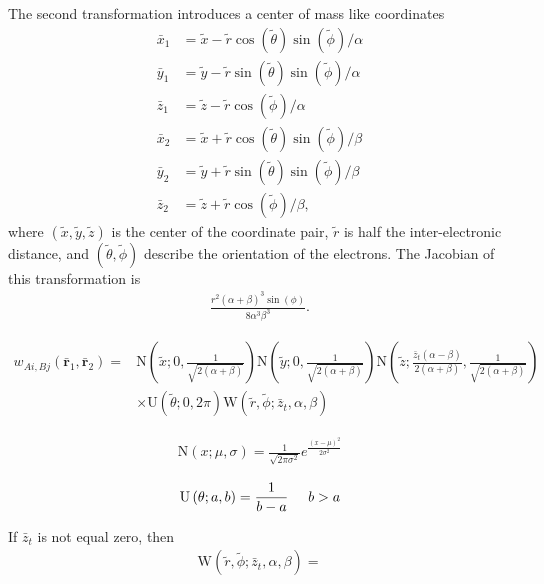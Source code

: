 \documentclass{revtex4}
\begin{document}
  The second transformation introduces a center of mass like coordinates 
  \begin{align}
    \bar{x}_1 &= \tilde{x} - \tilde{r} \cos(\tilde{\theta}) \sin(\tilde{\phi}) / \alpha \\
    \bar{y}_1 &= \tilde{y} - \tilde{r} \sin(\tilde{\theta}) \sin(\tilde{\phi}) / \alpha \\
    \bar{z}_1 &= \tilde{z} - \tilde{r} \cos(\tilde{\phi}) / \alpha \\
    \bar{x}_2 &= \tilde{x} + \tilde{r} \cos(\tilde{\theta}) \sin(\tilde{\phi}) / \beta \\
    \bar{y}_2 &= \tilde{y} + \tilde{r} \sin(\tilde{\theta}) \sin(\tilde{\phi}) / \beta \\
    \bar{z}_2 &= \tilde{z} + \tilde{r} \cos(\tilde{\phi}) / \beta,
  \end{align}
  where $(\tilde{x}, \tilde{y}, \tilde{z})$ is the center of the coordinate pair, $\tilde{r}$ is half the inter-electronic distance, and $(\tilde{\theta}, \tilde{\phi})$ describe the orientation of
  the electrons.
  The Jacobian of this transformation is
  \begin{align}
    \frac{r^2 (\alpha +\beta )^3 \sin (\phi )}{8 \alpha ^3 \beta ^3}.
  \end{align}

  \begin{align}
  w_{Ai,Bj}(\bar{\mathbf{r}}_1, \bar{\mathbf{r}}_2) =& 
  \mathrm{N}\left(\tilde{x}; 0, \frac{1}{\sqrt{2(\alpha + \beta)}}\right)
  \mathrm{N}\left(\tilde{y}; 0, \frac{1}{\sqrt{2(\alpha + \beta)}}\right)
  \mathrm{N}\left(\tilde{z}; \frac{\bar{z}_t (\alpha -\beta )}{2 (\alpha +\beta )}, \frac{1}{\sqrt{2(\alpha + \beta)}}\right) \nonumber \\
  & \times \mathrm{U}\left(\tilde{\theta}; 0, 2 \pi\right)
    \mathrm{W}\left(\tilde{r}, \tilde{\phi}; \bar{z}_t, \alpha, \beta\right)
  \end{align}

  \begin{align}
    \mathrm{N}\left(x; \mu, \sigma\right) = \frac{1}{\sqrt{2\pi \sigma^2}} e^{\frac{(x-\mu)^2}{2 \sigma^2}}
  \end{align}

  \begin{align}
    \mathrm{U}\left(\theta; a, b\right) = \frac{1}{b - a} \hspace{5mm} b>a
  \end{align}

  If $\bar{z}_t$ is not equal zero, then
  \begin{align}
    \mathrm{W}\left(\tilde{r}, \tilde{\phi}; \bar{z}_t, \alpha, \beta\right) = 
  \end{align}
\end{document}
